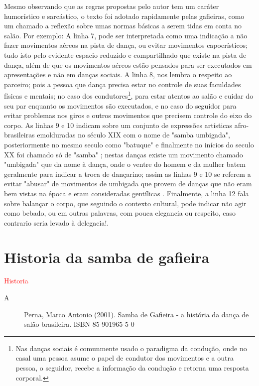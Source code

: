 Mesmo observando que as regras propostas pelo autor tem um caráter humorístico e sarcástico,
o texto foi adotado rapidamente pelas gafieiras, como um chamado a reflexão sobre umas
normas básicas a serem tidas em conta no salão. Por exemplo: 
A linha 7, pode ser interpretada como uma indicação a 
não fazer movimentos aéreos na pista de dança,
ou  evitar movimentos capoerísticos; tudo isto
pelo evidente espacio reduzido e compartilhado que existe na pista de dança, 
além de que os movimentos aéreos estão pensados para ser
executados em apresentações e não em danças sociais. 
A linha 8, nos lembra o respeito ao parceiro; pois a pessoa que dança precisa
estar no controle de suas faculdades físicas e mentais; 
no caso dos condutores\footnote{\label{footlab:conducao}Nas danças sociais é comunmente usado o paradigma 
da condução, onde no casal uma pessoa asume o papel de condutor dos movimentos e 
a outra pessoa, o seguidor, recebe a informação da condução e retorna uma resposta corporal.}, 
para estar atentos ao salão e cuidar do seu par enquanto os movimentos são executados, 
e no caso do seguidor para evitar problemas
nos giros e outros movimentos que precisem  controle do eixo do corpo.
As linhas 9 e 10 indicam sobre um conjunto de expressões artísticas 
afro-brasileiras emolduradas no século XIX com o nome de "samba umbigada",
posteriormente no mesmo seculo como "batuque" e finalmente no inícios do seculo XX foi chamado só 
de "samba" \cite[pp. 47]{diniz2008almanaque} \cite[pp. 85]{sandroni2001feitico}; nestas danças existe
um movimento chamado "umbigada" \cite{da2015historia} que da nome à dança, onde o ventre do homem e da mulher batem geralmente para indicar
a troca de dançarino; assim as linhas 9 e 10 se referem a
 evitar "abusar" de movimentos de umbigada que provem de danças que não eram bem vistas na época e eram consideradas gentílicas \cite[pp. 85]{sandroni2001feitico}.
Finalmente,
a linha 12 fala sobre balançar o corpo, que seguindo o contexto cultural, 
pode indicar não agir como bebado\cite{diccionario1858}, ou em outras palavras,
com pouca elegancia ou respeito,
caso contrario seria levado à delegacia!.





\section{Historia da samba de gafieira}


\textcolor{red}{Historia}
\begin{description}

\item [A] Perna, Marco Antonio (2001). Samba de Gafieira - a história da dança de salão brasileira. ISBN 85-901965-5-0

\end{description}




